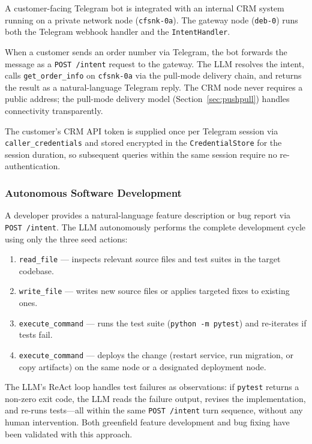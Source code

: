 \documentclass[10pt,twocolumn]{article}
\begin{document}
A customer-facing Telegram bot is integrated with an internal CRM
system running on a private network node (\texttt{cfsnk-0a}). The
gateway node (\texttt{deb-0}) runs both the Telegram webhook handler
and the \texttt{IntentHandler}.

When a customer sends an order number via Telegram, the bot forwards
the message as a \texttt{POST /intent} request to the gateway. The
LLM resolves the intent, calls \texttt{get\_order\_info} on
\texttt{cfsnk-0a} via the pull-mode delivery chain, and returns the
result as a natural-language Telegram reply. The CRM node never
requires a public address; the pull-mode delivery model
(Section~\ref{sec:pushpull}) handles connectivity transparently.

The customer's CRM API token is supplied once per Telegram session
via \texttt{caller\_credentials} and stored encrypted in the
\texttt{CredentialStore} for the session duration, so subsequent
queries within the same session require no re-authentication.

\subsubsection{Autonomous Software Development}

A developer provides a natural-language feature description or bug
report via \texttt{POST /intent}. The LLM autonomously performs the
complete development cycle using only the three seed actions:

\begin{enumerate}[noitemsep, leftmargin=14pt]
  \item \texttt{read\_file} — inspects relevant source files and test
    suites in the target codebase.
  \item \texttt{write\_file} — writes new source files or applies
    targeted fixes to existing ones.
  \item \texttt{execute\_command} — runs the test suite
    (\texttt{python -m pytest}) and re-iterates if tests fail.
  \item \texttt{execute\_command} — deploys the change (restart
    service, run migration, or copy artifacts) on the same node or
    a designated deployment node.
\end{enumerate}

The LLM's ReAct loop handles test failures as observations: if
\texttt{pytest} returns a non-zero exit code, the LLM reads the
failure output, revises the implementation, and re-runs tests---all
within the same \texttt{POST /intent} turn sequence, without any
human intervention. Both greenfield feature development and bug
fixing have been validated with this approach.
\end{document}
